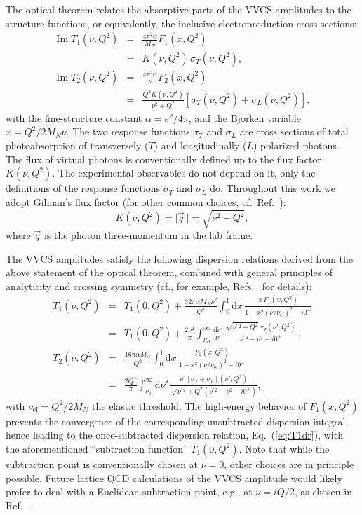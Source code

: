 \documentclass[12pt,preprint,tightenlines,
showpacs,preprintnumbers,amsmath,amssymb,
a4paper,nofootinbib]{revtex4-2}
\def\beq{\begin{equation}}
\def\eeq{\end{equation}}
\def\bea{\begin{eqnarray}}
\def\eea{\end{eqnarray}}
\def\eqlab#1{\label{eq:#1}}
\def\Eqref#1{Eq.~(\ref{eq:#1})}
\def\al{\alpha}
\def\si{\sigma} \def\Si{{\it\Sigma}}
\def\nn{\nonumber}
\def\dd{\mathrm{d}}
\DeclareMathOperator\im{Im}
\begin{document}
The optical theorem relates the absorptive parts of the VVCS amplitudes to the structure functions, or equivalently, the inclusive electroproduction cross sections:
\begin{subequations}
\eqlab{VVCSunitarity}
\bea
\im T_1(\nu,Q^2)&=&\frac{4\pi^2\al}{M_N}F_1(x,Q^2) \eqlab{ImT1}\\  &=& K(\nu,Q^2)\,\sigma_T(\nu,Q^2), \nn\\
\im T_2(\nu,Q^2)&=&\frac{4\pi^2\al}{\nu}F_2(x,Q^2)\eqlab{ImT2}\\
 &=& \frac{Q^2  K(\nu,Q^2) }{\nu^2+Q^2}\left[\sigma_T(\nu,Q^2)+\sigma_L(\nu,Q^2)\right],\nn
\eea
\end{subequations}
with the fine-structure constant $\alpha=e^2/4\pi$, and the Bjorken variable $x=Q^2/2M_N \nu$. The two response functions $\sigma_T$ and $\sigma_L$ are cross sections of total photoabsorption  of transversely ($T$) and longitudinally ($L$) polarized photons.
The flux of virtual photons is
conventionally defined up to the flux factor $K(\nu,Q^2)$. The experimental observables do not depend on it, only the definitions of the response functions $\sigma_T$ and $\sigma_L$ do.  
Throughout this work we adopt  Gilman's flux factor 
(for other common choices, cf.~Ref.~\cite{Drechsel:2002ar}):
\beq 
K(\nu,Q^2)=\vert\vec{q}\,\vert=\sqrt{\nu^2+Q^2},
\eeq
where  $\vec{q}$ is the photon three-momentum in the lab frame.

The VVCS amplitudes satisfy the following dispersion relations derived from the above statement of the  optical theorem, combined with general principles of analyticity and crossing symmetry
(cf., for example, Refs.~\cite{Drechsel:2002ar,Hagelstein:2015egb,Pascalutsa:2018ced} for  details):
\begin{subequations}
\eqlab{genDRs}
\bea 
T_1 ( \nu, Q^2) &=&T_1(0,Q^2) + \frac{32\pi\al M_N\nu^2}{Q^4} \int_{0}^1 
\!\dd x \,
\frac{x\, F_1 (x, Q^2)}{1 - x^2 (\nu/\nu_{\mathrm{el}})^2 - i 0^+} \eqlab{T1dr}\\ 
&=& T_1(0,Q^2) + \frac{2\nu^2}{\pi } \int_{\nu_{\mathrm{el}}}^\infty\! \frac{\dd \nu'}{\nu'} \, 
\frac{\sqrt{\nu^{\prime\,2}+Q^2}\,\si_T ( \nu', Q^2)}{\nu^{\prime\,2} -\nu^2 - i 0^+}\,,\nn\\
T_2 ( \nu, Q^2) &=& \frac{16\pi\al M_N}{Q^2} \int_{0}^1 
\!\dd x\, 
\frac{F_2 (x, Q^2)}{1 - x^2 (\nu/\nu_{\mathrm{el}})^2  - i 0^+} \eqlab{T2dr}\\
&=&\frac{2Q^2}{\pi} \int_{\nu_{\mathrm{el}}}^\infty\! \dd \nu' \, 
\frac{\nu^{\prime}\,[ \si_T+\si_L] ( \nu', Q^2)}{\sqrt{\nu^{\prime\,2}+Q^2}(\nu^{\prime\,2} -\nu^2- i 0^+)} ,\nn
\eea 
\end{subequations}
with $\nu_{\mathrm{el}}=Q^2/2M_N$ the elastic threshold. The high-energy behavior of $F_1(x,Q^2)$ prevents the convergence of the corresponding unsubtracted dispersion integral,  hence
leading to the once-subtracted dispersion relation, \Eqref{T1dr}, with the aforementioned ``subtraction function'' $T_1(0,Q^2)$. 
Note that while the subtraction point is conventionally
chosen at $\nu = 0$, 
other choices are in principle possible. Future lattice QCD calculations of the VVCS amplitude would likely  prefer to deal
with a Euclidean subtraction point,  e.g., at $\nu =iQ/2$, as chosen in Ref.~\cite{Gasser:2020mzy}. 
\end{document}
